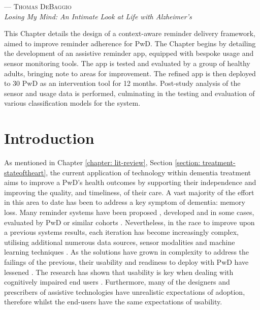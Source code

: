  \label{chapter: treatment-framework}

\setlength{\epigraphwidth}{.50\textwidth}
\begin{epigraphs}
{--- \textsc{Thomas DeBaggio} \\ \textit{Losing My Mind: An Intimate Look at Life with Alzheimer's}}
\end{epigraphs}

This Chapter details the design of a context-aware reminder delivery framework, aimed to improve reminder adherence for PwD. The Chapter begins by detailing the development of an assistive reminder app, equipped with bespoke usage and sensor monitoring tools. The app is tested and evaluated by a group of healthy adults, bringing note to areas for improvement. The refined app is then deployed to 30 PwD as an intervention tool for 12 months. Post-study analysis of the sensor and usage data is performed, culminating in the testing and evaluation of various classification models for the system.

\section{Introduction}
As mentioned in Chapter \ref{chapter: lit-review}, Section \ref{section: treatment-stateoftheart}, the current application of technology within dementia treatment aims to improve a PwD's health outcomes by supporting their independence and improving the quality, and timeliness, of their care. A vast majority of the effort in this area to date has been to address a key symptom of dementia: memory loss.
Many reminder systems have been proposed \cite{Droes2007, Osmani2009}, developed \cite{Du2008} and in some cases, evaluated by PwD or similar cohorts \cite{ONeill2010, Wilson1997}. Nevertheless, in the race to improve upon a previous systems results, each iteration has become increasingly complex, utilising additional numerous data sources, sensor modalities and machine learning techniques \cite{Du2008, Lim2008, Osmani2009,Wagner2010, Ylmaz2012}. As the solutions have grown in complexity to address the failings of the previous, their usability and readiness to deploy with PwD have lessened \cite{Hwang2013, Hwang2015, Yagil2016}. The research has shown that usability is key when dealing with cognitively impaired end users \cite{Shneiderman2000}. Furthermore, many of the designers and prescribers of assistive technologies have unrealistic expectations of adoption, therefore whilst the end-users have the same expectations of usability\cite{DeJoode2010, Cleland2014-IWAAL}.

